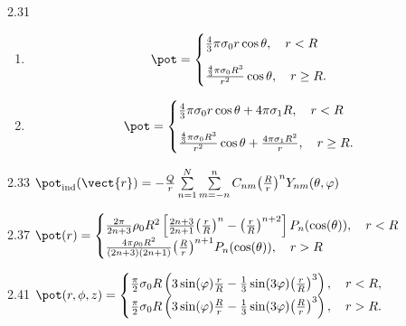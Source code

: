 \begin{Solution}{2.{31}}
	\begin{enumerate}[label=\alph*)]
		\item%
		      \begin{equation}
			      \pot = \begin{cases}
				      \frac43\pi\sigma_0r \cos\theta, \quad r<R \\[1em]
				      \frac{\frac43\pi\sigma_0R^3}{r^2} \cos\theta, \quad r \ge R.
			      \end{cases}
		      \end{equation}
		\item%
		      \begin{equation}
			      \pot = \begin{cases}
				      \frac43\pi\sigma_0r \cos\theta + 4\pi\sigma_1 R, \quad r<R \\[1em]
				      \frac{\frac43\pi\sigma_0R^3}{r^2} \cos\theta + \frac{4\pi\sigma_1 R^2}{r}, \quad r \ge R.
			      \end{cases}
		      \end{equation}
	\end{enumerate}
\end{Solution}
\begin{Solution}{2.{33}}
	$\pot_\text{ind}(\vect{r}) =  - \frac{Q}{r}\sum\limits_{n = 1}^N \sum\limits_{m =  - n}^n {C_{nm}{\left( \frac{R}{r} \right)^n}} Y_{nm}(\theta ,\varphi )$
\end{Solution}
\begin{Solution}{2.{37}}
	$\pot (r) =
		\begin{cases}
			\frac{{2\pi }}{{2n + 3}}{\rho _0}{R^2}\left[ {\frac{{2n + 3}}{{2n + 1}}{{\left( {\frac{r}{R}} \right)}^n} - {{\left( {\frac{r}{R}} \right)}^{n + 2}}} \right]{P_n}(\cos (\theta )) , \quad r<R \\
			\frac{{4\pi {\rho _0}{R^2}}}{{(2n + 3)(2n + 1)}}{\left( {\frac{R}{r}} \right)^{n + 1}}{P_n}(\cos (\theta )) , \quad r>R
		\end{cases}$
\end{Solution}
\begin{Solution}{2.{41}}
	$
		\pot(r, \phi, z) =
		\begin{cases}
			\frac{\pi }{2}{\sigma _0}R\left( {3\sin (\varphi )\frac{r}{R} - \frac{1}{3}\sin (3\varphi ){{\left( {\frac{r}{R}} \right)}^3}} \right), \quad r < R , \\
			\frac{\pi }{2}{\sigma _0}R\left( {3\sin (\varphi )\frac{R}{r} - \frac{1}{3}\sin (3\varphi ){{\left( {\frac{R}{r}} \right)}^3}} \right) , \quad r > R .
		\end{cases}
	$
\end{Solution}
